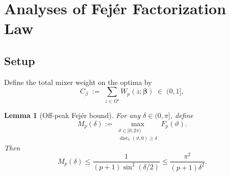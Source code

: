 \documentclass[a4paper,unpublished,onecolumn,11pt]{quantumarticle}
\newtheorem{lemma}[theorem]{Lemma}
\theoremstyle{definition}
\theoremstyle{remark}
\begin{document}
\section{Analyses of Fej\'er Factorization Law}
\label{sec:base-success-three-regimes}
\subsection{Setup}


Define the total mixer weight on
the optima by
\begin{equation}
  \label{eq:Pi-star-def}
  C_{\beta} \;:=\; \sum_{z\in\Omega^\star} W_p(z;\boldsymbol\beta)
  \;\in\; (0,1],
\end{equation}





\begin{lemma}[Off-peak Fej\'er bound]
\label{lem:fejer-offpeak}
For any $\delta\in(0,\pi]$, define
\begin{equation}
\label{eq:Mp-wrapped}
M_p(\delta)
:=
\max_{\substack{\vartheta\in[0,2\pi)\\
\operatorname{dist}_{\mathbb T}(\vartheta,0)\ge\delta}}
F_p(\vartheta).
\end{equation}
Then
\begin{equation}
\label{eq:Mp-bound}
M_p(\delta)
\le
\frac{1}{(p+1)\sin^2(\delta/2)}
\le
\frac{\pi^2}{(p+1)\delta^2}.
\end{equation}
\end{lemma}
\end{document}
